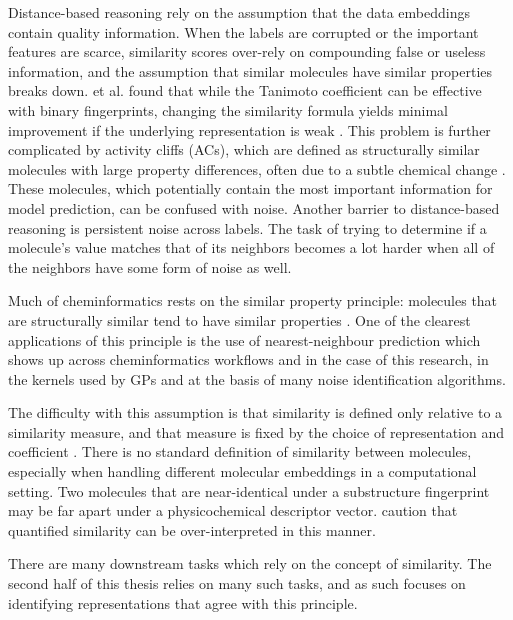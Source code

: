 Distance-based reasoning rely on the assumption that the data embeddings  contain quality information. When the labels are corrupted or the important features are scarce, similarity scores over-rely on compounding false or useless information, and the assumption that similar molecules have similar properties breaks down. \citet{Bajusz2015} et al. found that while the Tanimoto coefficient can be effective with binary fingerprints, changing the similarity formula yields minimal improvement if the underlying representation is weak \citep{Bajusz2015}.
This problem is further complicated by activity cliffs (ACs), which are defined as structurally similar molecules with large property differences, often due to a subtle chemical change \citep{Stumpfe2012, Dablander2023}. These molecules, which potentially contain the most important information for model prediction, can be confused with noise. Another barrier to distance-based reasoning is persistent noise across labels. The task of trying to determine if a molecule's value matches that of its neighbors becomes a lot harder when all of the neighbors have some form of noise as well. 


Much of cheminformatics rests on the similar property principle: molecules that are structurally similar tend to have similar properties \citep{Johnson1990, vanTilborg2022}. 
One of the clearest applications of this principle is the use of nearest-neighbour prediction which shows up across cheminformatics workflows and in the case of this research, in the kernels used by GPs and at the basis of many noise identification algorithms.

The difficulty with this assumption is that similarity is defined only relative to a similarity measure, and that measure is fixed by the choice of representation and
coefficient \citep{Maggiora2014}. There is no standard definition of similarity between molecules, especially when handling different molecular embeddings in a computational setting. Two molecules that are near-identical under a substructure fingerprint may be far apart under a physicochemical descriptor vector. \citet{Maggiora2014} caution that quantified similarity can be over-interpreted in this manner. 

There are many downstream tasks which rely on the concept of similarity. The second half of this thesis relies on many such tasks, and as such focuses on identifying representations that agree with this principle. 


